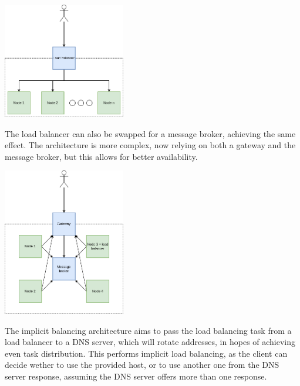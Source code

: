 \documentclass[conference]{IEEEtran}
\begin{document}
    \begin{center}
        \vspace{1em}
        \includegraphics[width=0.4\textwidth]{traditional-load-balancing.png}
         \label{traditional-load-balancing}
        \vspace{1em}
    \end{center}

    The load balancer can also be swapped for a message broker, achieving the same effect. The architecture is more complex,
now relying on both a gateway and the message broker, but this allows for better availability.

    \begin{center}
        \vspace{1em}
        \includegraphics[width=0.4\textwidth]{message-broker-balancing.png}
         \label{message-broker-load-balancing}
        \vspace{1em}
    \end{center}    

    The implicit balancing architecture aims to pass the load balancing task from a load balancer to a DNS server,
which will rotate addresses, in hopes of achieving even task distribution. This performs implicit load balancing, as the
client can decide wether to use the provided host, or to use another one from the DNS server response, assuming the DNS
server offers more than one response.
\end{document}
